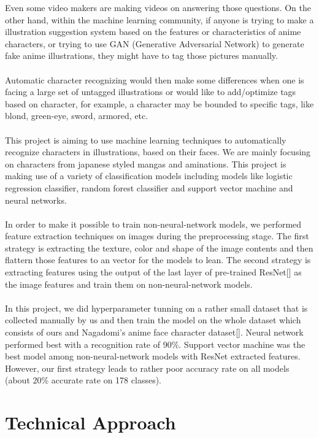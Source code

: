 \documentclass[11.5pt]{article}
\begin{document}
    Even some video makers are making videos on answering those questions.
    On the other hand, within the machine learning community, if anyone is trying to make a illustration suggestion system based on the features or characteristics of anime characters, or trying to use GAN (Generative Adversarial Network) to generate fake anime illustrations, they might have to tag those pictures manually.\\ \\
    Automatic character recognizing would then make some differences when one is facing a large set of untagged illustrations or would like to add/optimize tags based on character, for example, a character may be bounded to specific tags, like blond, green-eye, sword, armored, etc.\\ \\
    This project is aiming to use machine learning techniques to automatically recognize characters in illustrations, based on their faces. We are mainly focusing on characters from japanese styled mangas and aminations. This project is making use of a variety of classification models including models like logistic regression classifier, random forest classifier and support vector machine and neural networks.\\ \\
    In order to make it possible to train non-neural-network models, we performed feature extraction techniques on images during the preprocessing stage. The first strategy is extracting the texture, color and shape of the image contents and then flattern those features to an vector for the models to lean. The second strategy is extracting features using the output of the last layer of pre-trained ResNet[] as the image features and train them on non-neural-network models.\\ \\
    In this project, we did hyperparameter tunning on a rather small dataset that is collected manually by us and then train the model on the whole dataset which consists of ours and Nagadomi's anime face character dataset[]. Neural network performed best with a recognition rate of 90\%. Support vector machine was the best model among non-neural-network models with ResNet extracted features. However, our first strategy leads to rather poor accuracy rate on all models (about 20\% accurate rate on 178 classes).


    \section{Technical Approach}
\end{document}
